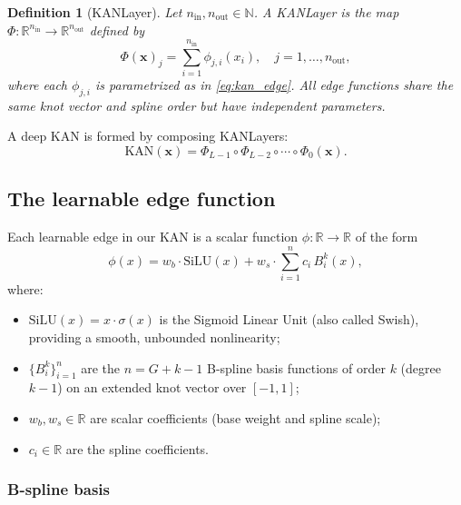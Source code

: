 \documentclass[11pt]{article}
\newcommand{\R}{\mathbb{R}}
\newcommand{\N}{\mathbb{N}}
\newtheorem{definition}{Definition}[section]
\theoremstyle{remark}
\begin{document}
\begin{definition}[KANLayer]
\label{def:kanlayer}
Let $n_{\mathrm{in}}, n_{\mathrm{out}} \in \N$. A \emph{KANLayer} is the map $\Phi:\R^{n_{\mathrm{in}}} \to \R^{n_{\mathrm{out}}}$ defined by
\begin{equation}
\Phi(\mathbf{x})_j = \sum_{i=1}^{n_{\mathrm{in}}} \phi_{j,i}(x_i), \quad j = 1,\ldots,n_{\mathrm{out}},
\end{equation}
where each $\phi_{j,i}$ is parametrized as in \eqref{eq:kan_edge}. All edge functions share the same knot vector and spline order but have independent parameters.
\end{definition}

A deep KAN is formed by composing KANLayers:
\begin{equation}
\mathrm{KAN}(\mathbf{x}) = \Phi_{L-1} \circ \Phi_{L-2} \circ \cdots \circ \Phi_0(\mathbf{x}).
\end{equation}

\subsection{The learnable edge function}
\label{subsec:edge_function}

Each learnable edge in our KAN is a scalar function $\phi:\R \to \R$ of the form
\begin{equation}\label{eq:kan_edge}
\phi(x) = w_b \cdot \mathrm{SiLU}(x) + w_s \cdot \sum_{i=1}^{n} c_i\,B_i^k(x),
\end{equation}
where:
\begin{itemize}[nosep]
    \item $\mathrm{SiLU}(x) = x \cdot \sigma(x)$ is the Sigmoid Linear Unit (also called Swish), providing a smooth, unbounded nonlinearity;
    \item $\{B_i^k\}_{i=1}^{n}$ are the $n = G + k - 1$ B-spline basis functions of order $k$ (degree $k-1$) on an extended knot vector over $[-1,1]$;
    \item $w_b, w_s \in \R$ are scalar coefficients (base weight and spline scale);
    \item $c_i \in \R$ are the spline coefficients.
\end{itemize}

\subsubsection{B-spline basis}
\end{document}
